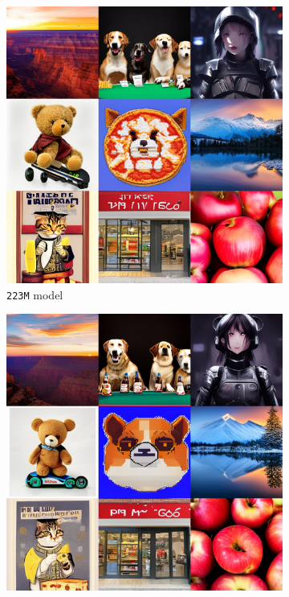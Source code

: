 \begin{figure}[htbp]
    \begin{subfigure}[b]{0.32\textwidth}
    \centering
    \includegraphics[width=\textwidth]{cp2/figures/t2i/c160.jpg}
    \caption{\texttt{223M} model}
    \end{subfigure}
    \begin{subfigure}[b]{0.32\textwidth}
    \centering
    \includegraphics[width=\textwidth]{cp2/figures/t2i/c192.jpg}

\end{subfigure}
\end{figure}
